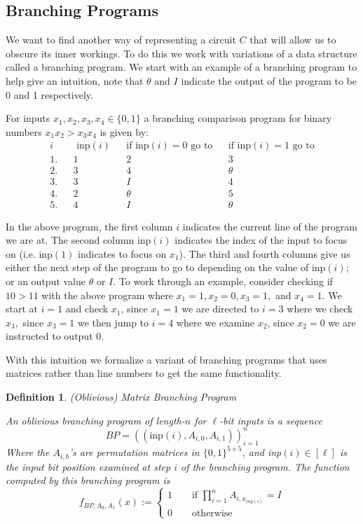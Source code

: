 \documentclass[12pt,twoside]{reedthesis}
\newtheorem{definition}{Definition}
\begin{document}
    \subsection{Branching Programs}
    
    \par We want to find another way of representing a circuit $C$ that will allow us to obscure its inner workings. To do this we work with variations of a data structure called a branching program. We start with an example of a branching program to help give an intuition, note that $\theta$ and $I$ indicate the output of the program to be 0 and 1 respectively.
      \par For inputs $x_1,x_2,x_3,x_4\in \{ 0 ,1\}$  a branching comparison program for binary numbers  $x_1x_2 > x_3x_4$ is given by:
    \begin{align*}
    i &&\text{ inp}(i) &&\text{if inp}(i)=0 \text{ go to} &&\text{if inp}(i)=1 \text{ go to} \\
    1. &&1 &&2 &&3 \\
    2. &&3 &&4 &&\theta \\
    3. &&3 &&I &&4 \\
    4. &&2 &&\theta &&5 \\
    5. &&4 &&I &&\theta
    \end{align*}
    
    In the above program, the first column $i$ indicates the current line of the program we are at. The second column inp$(i)$ indicates the index of the input to focus on (i.e. inp$(1)$ indicates to focus on $x_1$). The third and fourth columns give us either the next step of the program to go to depending on the value of inp$(i)$; or an output value $\theta$ or $I$. To work through an example, consider checking if $10 > 11$ with the above program where $x_1 = 1, x_2 = 0, x_3 = 1,$ and $x_4 = 1$. We start at $i = 1$ and check $x_1$, since $x_1 = 1$ we are directed to $i = 3$ where we check $x_3,$ since $x_3 = 1$ we then jump to $i=4$ where we examine $x_2$, since $x_2 = 0$ we are instructed to output 0. 
          \par With this intuition we formalize a variant of branching programs that uses matrices rather than line numbers to get the same functionality.
    \begin{definition}{(Oblivious) Matrix Branching Program}
    \par  An oblivious branching program of length-$n$ for $\ell$-bit inputs is a sequence
    $$BP = ((\text{inp}(i),A_{i,0},A_{i,1}))_{i=1}^n $$
    Where the $A_{i,b}$'s are permutation matrices in $\{0,1\}^{5 \times 5}$, and inp$(i)\in [\ell]$ is the input bit position examined at step $i$ of the branching program. The function computed by this branching program is
    $$f_{BP,A_0,A_1}(x):= \begin{cases}
    1 \quad \quad \text{if } \prod_{i=1}^n A_{i,x_{inp(i)}} = I \\
    0 \quad \quad \text{otherwise} 
    \end{cases}$$
    \end{definition}
    
\end{document}
